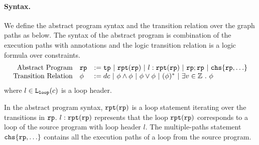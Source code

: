 \paragraph{Syntax.}
We define the abstract program syntax and the transition relation over the graph paths as below. 
The syntax of the abstract program is combination of the execution paths with annotations and the logic transition relation is a logic formula over constraints.
\[
  \begin{array}{rll}
   \mbox{Abstract Program} & \rprog &:= \tpath ~|~ \rprepeat(\rprog) ~|~ l : \rprepeat(\rprog) ~|~ \rprog;\rprog ~|~ \rpchoose{\rprog, \ldots} \\
   \mbox{Transition Relation} & \phi & := dc ~|~ \phi \land \phi ~|~ \phi \lor \phi ~|~ (\phi)^* ~|~ \exists v \in \mathbb{Z} \st \phi
  \end{array}
\]
where $l\in \mathtt{L}_{\mathtt{loop}}(c)$ is a loop header.

In the abstract program syntax, $\mathtt{rpt}(\mathtt{rp})$ is a loop statement iterating over the transitions in $\mathtt{rp}$.
$l: \mathtt{rpt}(\mathtt{rp})$ represents that the loop $ \mathtt{rpt}(\mathtt{rp})$
corresponds to a loop of the source program with loop header $l$.
The multiple-paths statement $\rpchoose{\rprog, \ldots} $ contains all the execution paths of a loop from the source program.

